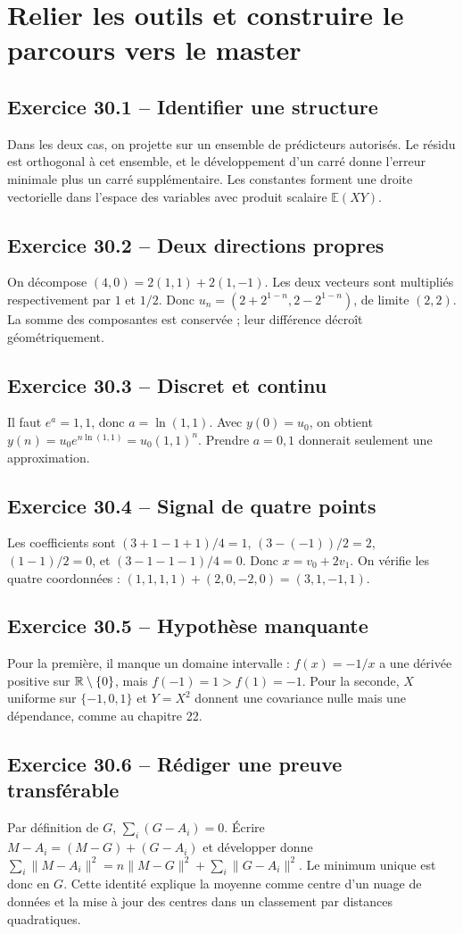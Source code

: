 \chapter{Relier les outils et construire le parcours vers le master}
\section*{Exercice 30.1 -- Identifier une structure}
Dans les deux cas, on projette sur un ensemble de prédicteurs autorisés. Le résidu est orthogonal à cet ensemble, et le développement d'un carré donne l'erreur minimale plus un carré supplémentaire. Les constantes forment une droite vectorielle dans l'espace des variables avec produit scalaire $\mathbb E(XY)$.

\section*{Exercice 30.2 -- Deux directions propres}
On décompose $(4,0)=2(1,1)+2(1,-1)$. Les deux vecteurs sont multipliés respectivement par $1$ et $1/2$. Donc $u_n=(2+2^{1-n},2-2^{1-n})$, de limite $(2,2)$. La somme des composantes est conservée ; leur différence décroît géométriquement.

\section*{Exercice 30.3 -- Discret et continu}
Il faut $e^a=1{,}1$, donc $a=\ln(1{,}1)$. Avec $y(0)=u_0$, on obtient $y(n)=u_0e^{n\ln(1{,}1)}=u_0(1{,}1)^n$. Prendre $a=0{,}1$ donnerait seulement une approximation.

\section*{Exercice 30.4 -- Signal de quatre points}
Les coefficients sont $(3+1-1+1)/4=1$, $(3-(-1))/2=2$, $(1-1)/2=0$, et $(3-1-1-1)/4=0$. Donc $x=v_0+2v_1$. On vérifie les quatre coordonnées : $(1,1,1,1)+(2,0,-2,0)=(3,1,-1,1)$.

\section*{Exercice 30.5 -- Hypothèse manquante}
Pour la première, il manque un domaine intervalle : $f(x)=-1/x$ a une dérivée positive sur $\mathbb{R}\setminus\{0\}$, mais $f(-1)=1>f(1)=-1$. Pour la seconde, $X$ uniforme sur $\{-1,0,1\}$ et $Y=X^2$ donnent une covariance nulle mais une dépendance, comme au chapitre 22.

\section*{Exercice 30.6 -- Rédiger une preuve transférable}
Par définition de $G$, $\sum_i(G-A_i)=0$. Écrire $M-A_i=(M-G)+(G-A_i)$ et développer donne $\sum_i\|M-A_i\|^2=n\|M-G\|^2+\sum_i\|G-A_i\|^2$. Le minimum unique est donc en $G$. Cette identité explique la moyenne comme centre d'un nuage de données et la mise à jour des centres dans un classement par distances quadratiques.
